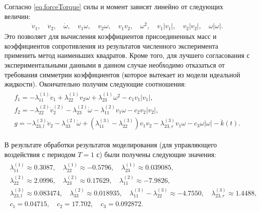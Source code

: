 Согласно \eqref{eq.forceTorque} силы и момент зависят линейно от следующих величин:
\begin{gather}
	\dot{v}_{1},\quad \dot{v}_{2},\quad \dot{\omega},\quad
	v_{1} \omega,\quad v_{2} \omega,\quad v_{1}v_{2},\quad \omega^2,\quad v_1 |v_1|,\quad v_2 |v_2|,\quad \omega |\omega|.
\end{gather}
Это позволяет для вычисления коэффициентов присоединенных масс и коэффициентов сопротивления из результатов численного эксперимента применить метод наименьших квадратов. Кроме того, для лучшего согласования с экспериментальными данными в данном случае необходимо отказаться от требования симметрии коэффициентов (которое вытекает из модели идеальной жидкости). Окончательно получим следующие соотношения:
\begin{gather}
	\begin{gathered}
		f_1 = - \lambda_{11}^{(1)} \dot{v}_1 + \lambda_{22}^{(1)} v_2 \omega + \lambda_{23}^{(1)}\omega^2 - c_1 v_1 |v_1|, \\
		f_2 = - \lambda_{22}^{(2)} \dot{v}_2^{(2)} - \lambda_{23}^{(2)} \dot{\omega} - \lambda_{11}^{(2)} v_1 \omega - c_2 v_2 |v_2|,\\
		g = -\lambda_{23,l}^{(3)} \dot{v}_2 - \lambda_{33}^{(2)} \dot{\omega} + (\lambda_{11}^{(3)} - \lambda_{22}^{(3)}) v_1 v_2 - \lambda_{23,r}^{(3)} v_1\omega - c_3 \omega |\omega| - \dot{k}(t).
	\end{gathered}\label{eq.newfg}
\end{gather}


В результате обработки результатов моделирования (для управляющего воздействия с периодом $T = 1$ с) были получены следующие значения:
\begin{gather}
	\begin{gathered}
		\lambda_{11}^{(1)} \approx 0.3087, \quad 
		\lambda_{22}^{(1)} \approx -0.5796,\quad 
		\lambda_{23}^{(1)} \approx 0.039085,\\
		\lambda_{22}^{(2)} \approx 2.0996,\quad 
		\lambda_{23}^{(2)} \approx 0.17629,\quad
		\lambda_{11}^{(2)} \approx -7.9826,\\
		\lambda_{23,l}^{(3)} \approx 0.083474,\quad
		\lambda_{33}^{(2)} \approx 0.018935,\quad
		\lambda_{11}^{(3)} - \lambda_{22}^{(3)} \approx - 4.7550,\quad
		\lambda_{23,r}^{(3)} \approx 1.4488,\\
		c_1 = 0.04715,\quad c_2 = 17.702,\quad c_3 = 0.092872.
	\end{gathered}\label{eq.coeffs2}
\end{gather}


